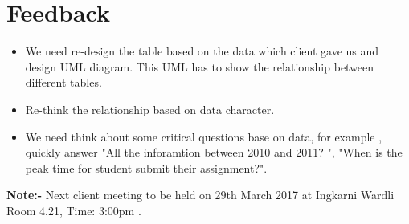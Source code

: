 \documentclass[11pt, a4paper]{article}
\begin{document}
\section{Feedback}
\begin{itemize}
\item We need re-design the table based on the data which client gave us and design UML diagram. This UML has to show the relationship between different tables.
\item Re-think the relationship based on data character.
\item We need think about some critical questions base on data, for example , quickly answer "All the inforamtion between 2010 and 2011? ", "When is the peak time for student submit their assignment?".
\end{itemize}

\vspace*{20pt}
\noindent  \textbf{Note:-} Next client meeting to be held on 29th March 2017 at Ingkarni Wardli Room 4.21, Time: 3:00pm .
\end{document}
